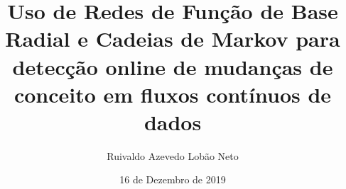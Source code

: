 \documentclass[msc, classic, a4paper]{ufbathesis}
\institute{Instituto de Matem\'{a}tica}
\title{Uso de Redes de Função de Base Radial e Cadeias de Markov para detecção online de mudanças de conceito em fluxos contínuos de dados}
\date{16 de Dezembro de 2019}
\author{Ruivaldo Azevedo Lobão Neto}
\begin{document}
\pgcompfrontpage

\frontmatter

\pgcomppresentationpage










\resumo
\end{document}
